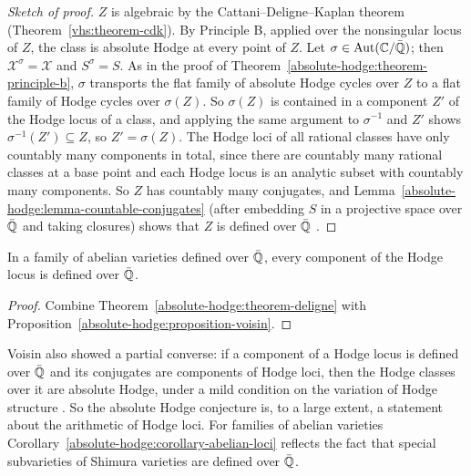 \begin{proof}[Sketch of proof]
$Z$ is algebraic by the Cattani--Deligne--Kaplan theorem (Theorem~\ref{vhs:theorem-cdk}). By Principle B, applied over the nonsingular locus of $Z$, the class is absolute Hodge at every point of $Z$. Let
$\sigma \in \mathrm{Aut}(\mathbb{C}/\bar{\mathbb{Q}})$; then $\mathcal{X}^\sigma = \mathcal{X}$ and $S^\sigma = S$. As in the proof of Theorem~\ref{absolute-hodge:theorem-principle-b}, $\sigma$ transports the flat family of absolute
Hodge cycles over $Z$ to a flat family of Hodge cycles over $\sigma(Z)$. So $\sigma(Z)$ is contained in a component $Z'$ of the Hodge locus of a class, and applying the same argument to $\sigma^{-1}$ and $Z'$
shows $\sigma^{-1}(Z') \subseteq Z$, so $Z' = \sigma(Z)$. The Hodge loci of all rational classes have only countably many components in total, since there are countably many rational classes at a base point
and each Hodge locus is an analytic subset with countably many components. So $Z$ has countably many conjugates, and Lemma~\ref{absolute-hodge:lemma-countable-conjugates} (after embedding $S$ in a
projective space over $\bar{\mathbb{Q}}$ and taking closures) shows that $Z$ is defined over $\bar{\mathbb{Q}}$ \cite{voisin-2007}.
\end{proof}

\begin{corollary}\label{absolute-hodge:corollary-abelian-loci}
In a family of abelian varieties defined over $\bar{\mathbb{Q}}$, every component of the Hodge locus is defined over $\bar{\mathbb{Q}}$.
\end{corollary}

\begin{proof}
Combine Theorem~\ref{absolute-hodge:theorem-deligne} with Proposition~\ref{absolute-hodge:proposition-voisin}.
\end{proof}

\begin{remark}\label{absolute-hodge:remark-hodge-loci}
Voisin also showed a partial converse: if a component of a Hodge locus is defined over $\bar{\mathbb{Q}}$ and its conjugates are components of Hodge loci, then the Hodge classes over it are absolute Hodge,
under a mild condition on the variation of Hodge structure \cite{voisin-2007}. So the absolute Hodge conjecture is, to a large extent, a statement about the arithmetic of Hodge loci. For families of
abelian varieties Corollary~\ref{absolute-hodge:corollary-abelian-loci} reflects the fact that special subvarieties of Shimura varieties are defined over $\bar{\mathbb{Q}}$.
\end{remark}

